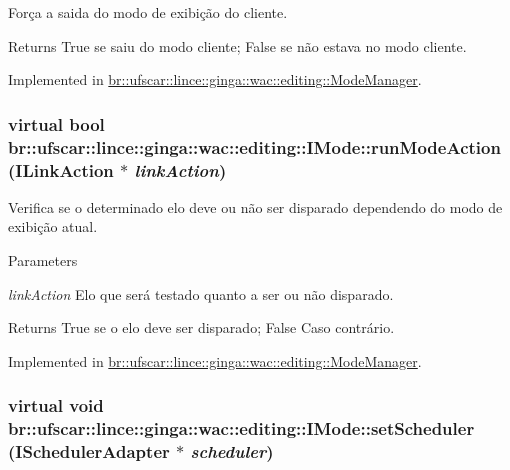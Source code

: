Força a saida do modo de exibição do cliente. 

\begin{DoxyReturn}{Returns}
True se saiu do modo cliente; False se não estava no modo cliente. 
\end{DoxyReturn}


Implemented in \hyperlink{classbr_1_1ufscar_1_1lince_1_1ginga_1_1wac_1_1editing_1_1ModeManager_a7d095b1de1af73c3296f4b6a29c6f08f}{br::ufscar::lince::ginga::wac::editing::ModeManager}.

\hypertarget{classbr_1_1ufscar_1_1lince_1_1ginga_1_1wac_1_1editing_1_1IMode_a5c0f479717a32e10c4810abdfe4e03d4}{
\subsubsection[{runModeAction}]{\setlength{\rightskip}{0pt plus 5cm}virtual bool br::ufscar::lince::ginga::wac::editing::IMode::runModeAction ({\bf ILinkAction} $\ast$ {\em linkAction})}}
\label{classbr_1_1ufscar_1_1lince_1_1ginga_1_1wac_1_1editing_1_1IMode_a5c0f479717a32e10c4810abdfe4e03d4}


Verifica se o determinado elo deve ou não ser disparado dependendo do modo de exibição atual. 


\begin{DoxyParams}{Parameters}
\item[{\em linkAction}]Elo que será testado quanto a ser ou não disparado. \end{DoxyParams}
\begin{DoxyReturn}{Returns}
True se o elo deve ser disparado; False Caso contrário. 
\end{DoxyReturn}


Implemented in \hyperlink{classbr_1_1ufscar_1_1lince_1_1ginga_1_1wac_1_1editing_1_1ModeManager_a5456384c5ce5e3d7114429e5e28273b8}{br::ufscar::lince::ginga::wac::editing::ModeManager}.

\hypertarget{classbr_1_1ufscar_1_1lince_1_1ginga_1_1wac_1_1editing_1_1IMode_a5048bc35fa6ade1b514f79467519b52f}{
\subsubsection[{setScheduler}]{\setlength{\rightskip}{0pt plus 5cm}virtual void br::ufscar::lince::ginga::wac::editing::IMode::setScheduler ({\bf ISchedulerAdapter} $\ast$ {\em scheduler})}}
\label{classbr_1_1ufscar_1_1lince_1_1ginga_1_1wac_1_1editing_1_1IMode_a5048bc35fa6ade1b514f79467519b52f}


